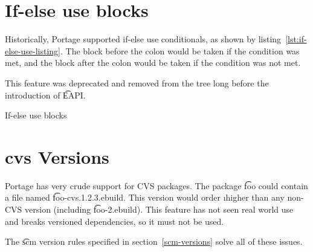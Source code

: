 \section{If-else use blocks}

Historically, Portage supported if-else use conditionals, as shown by
listing~\ref{lst:if-else-use-listing}. The block before the colon would be taken if the condition
was met, and the block after the colon would be taken if the condition was not met.

This feature was deprecated and removed from the tree long before the introduction of \t{EAPI}.

\begin{listing}
  \caption{If-else use blocks}\label{lst:if-else-use-listing}
  
\end{listing}

\section{cvs Versions}

Portage has very crude support for CVS packages. The package \t{foo} could contain a file named
\t{foo-cvs.1.2.3.ebuild}. This version would order \i{higher} than any non-CVS version (including
\t{foo-2.ebuild}). This feature has not seen real world use and breaks versioned dependencies, so
it must not be used.

\IFKDEBUILDELSE
{
    The \t{scm} version rules specified in section~\ref{scm-versions} solve all of these issues.
}{
}


